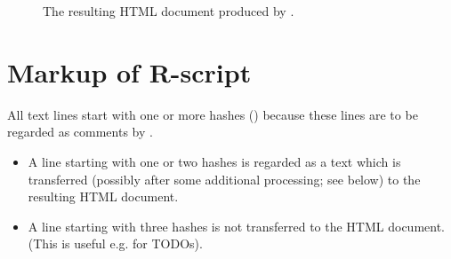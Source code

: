 \documentclass[11pt]{article}
\begin{document}
\begin{figure}[ht]
  \centering
  \caption{The resulting HTML document produced by \rep.}
  \label{fig:res3}
\end{figure}






\section{Markup of R-script}
\label{sec:markup}

All text lines start with one or more hashes (\code{\#}) because these
lines are to be regarded as comments by \R.

\begin{itemize}
\item A line starting with one or two hashes is regarded as a text which
  is transferred (possibly after some additional processing; see below)
  to the resulting HTML document.
\item A line starting with three hashes is not transferred to the HTML
  document. (This is useful e.g. for TODOs).
\end{itemize}
\end{document}
